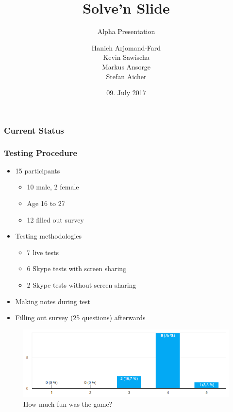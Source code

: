 \documentclass[xcolor=dvipsnames]{beamer}
\title{Solve'n Slide}
\subtitle{Alpha Presentation}
\author{Hanieh Arjomand-Fard\\Kevin Sawischa\\Markus Ansorge\\Stefan Aicher}
\date{09. July 2017}
\begin{document}
	\maketitle
	
	\begin{frame}
		\frametitle{Current Status}
		
	\end{frame}
	
	\begin{frame}
		\frametitle{Testing Procedure}
		\begin{itemize}
			\item 15 participants
			\begin{itemize}
				\item 10 male, 2 female
				\item Age 16 to 27
				\item 12 filled out survey
			\end{itemize}
			\item Testing methodologies
			\begin{itemize}
				\item 7 live tests
				\item 6 Skype tests with screen sharing
				\item 2 Skype tests without screen sharing
			\end{itemize}
			\item Making notes during test
			\item Filling out survey (25 questions) afterwards
		\end{itemize}

		 \begin{figure}[H]
		 	\centering
		 	\includegraphics[scale=.4]{images/playtesting/fun}
		 	\caption{How much fun was the game?}
		 \end{figure}
	\end{frame}
	
\end{document}
